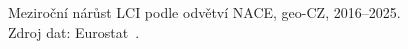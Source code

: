 \def\strProblemySektorLciTitle{\acs{geo-CZ}: růst indexu mzdových nákladů (\acs{LCI}) podle odvětví \acs{NACE}}%
\def\strProblemySektorLciXlabel{rok}%
\def\strProblemySektorLciYlabel{meziroční nárůst \acs{LCI} [\%]}%
\def\strProblemySektorLciCaption{Meziroční nárůst \acs{LCI} podle odvětví \acs{NACE}, \acs{geo-CZ}, 2016--2025. Zdroj dat: Eurostat~\cite{eurostat_lci}.}%
%
\begin{figure}[htbp]
  \centering
  \resizebox{0.95\linewidth}{!}{}
  \caption{\strProblemySektorLciCaption}
  \label{fig:problemy_sektor_lci}
\end{figure}
